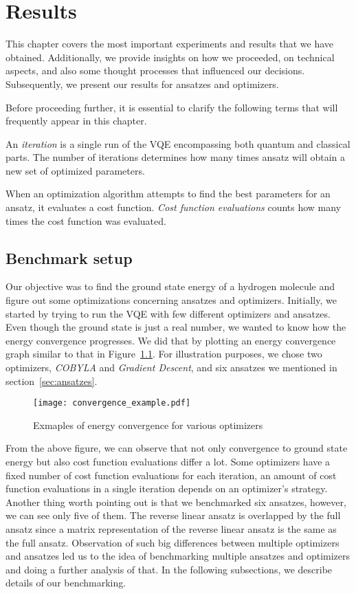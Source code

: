 \chapter{Results}\label{ch:results}
This chapter covers the most important experiments and results that we have obtained. Additionally, we provide insights on how we proceeded, on technical aspects, and also some thought processes that influenced our decisions. Subsequently, we present our results for ansatzes and optimizers.

Before proceeding further, it is essential to clarify the following terms that will frequently appear in this chapter.

An \textit{iteration} is a single run of the VQE encompassing both quantum and classical parts. The number of iterations determines how many times ansatz will obtain a new set of optimized parameters.

When an optimization algorithm attempts to find the best parameters for an ansatz, it evaluates a cost function. \textit{Cost function evaluations} counts how many times the cost function was evaluated.

\section{Benchmark setup}
Our objective was to find the ground state energy of a hydrogen molecule and figure out some optimizations concerning ansatzes and optimizers. Initially, we started by trying to run the VQE with few different optimizers and ansatzes. Even though the ground state is just a real number, we wanted to know how the energy convergence progresses. We did that by plotting an energy convergence graph similar to that in Figure~\ref{fig:energy-convergence}. For illustration purposes, we chose two optimizers, \textit{COBYLA} and \textit{Gradient Descent}, and six ansatzes we mentioned in section~\ref{sec:ansatzes}.
\begin{figure}[H]
    \centering
    \texttt{[image: convergence\_example.pdf]}
    \caption{Exmaples of energy convergence for various optimizers}
    \label{fig:energy-convergence}
\end{figure}
From the above figure, we can observe that not only convergence to ground state energy but also cost function evaluations differ a lot. Some optimizers have a fixed number of cost function evaluations for each iteration, an amount of cost function evaluations in a single iteration depends on an optimizer's strategy. Another thing worth pointing out is that we benchmarked six ansatzes, however, we can see only five of them. The reverse linear ansatz is overlapped by the full ansatz since a matrix representation of the reverse linear ansatz is the same as the full ansatz. Observation of such big differences between multiple optimizers and ansatzes led us to the idea of benchmarking multiple ansatzes and optimizers and doing a further analysis of that. In the following subsections, we describe details of our benchmarking.

